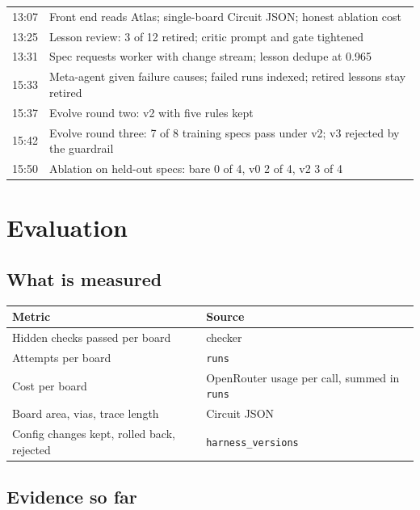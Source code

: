 \documentclass[11pt,a4paper]{article}
\newcommand{\code}[1]{\texttt{#1}}
\begin{document}
\begin{center}
\begin{tabular}{@{}L{1.4cm}L{13.6cm}@{}}
13:07 & Front end reads Atlas; single-board Circuit JSON; honest ablation cost \\
13:25 & Lesson review: 3 of 12 retired; critic prompt and gate tightened \\
13:31 & Spec requests worker with change stream; lesson dedupe at 0.965 \\
15:33 & Meta-agent given failure causes; failed runs indexed; retired lessons stay retired \\
15:37 & Evolve round two: v2 with five rules kept \\
15:42 & Evolve round three: 7 of 8 training specs pass under v2; v3 rejected by the guardrail \\
15:50 & Ablation on held-out specs: bare 0 of 4, v0 2 of 4, v2 3 of 4 \\
\bottomrule
\end{tabular}
\end{center}

\section{Evaluation}

\subsection{What is measured}

\begin{center}
\begin{tabular}{@{}L{6cm}L{9cm}@{}}
\toprule
Metric & Source \\
\midrule
Hidden checks passed per board & checker \\
Attempts per board & \code{runs} \\
Cost per board & OpenRouter usage per call, summed in \code{runs} \\
Board area, vias, trace length & Circuit JSON \\
Config changes kept, rolled back, rejected & \code{harness\_versions} \\
\bottomrule
\end{tabular}
\end{center}

\subsection{Evidence so far}
\end{document}
